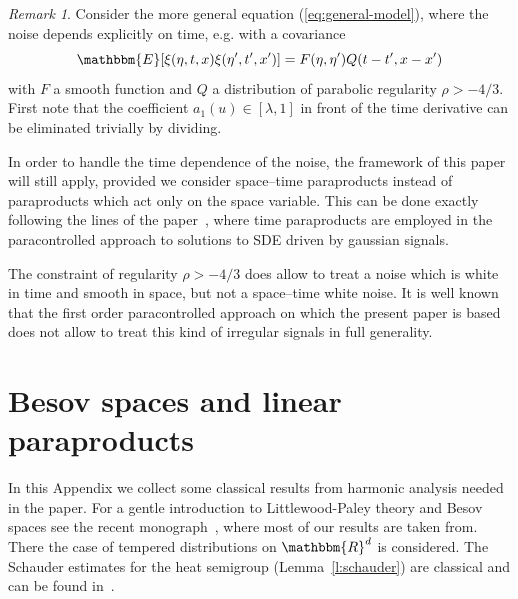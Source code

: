 \documentclass{amsart}
\theoremstyle{remark}
\newtheorem{remark}[theorem]{Remark}
\theoremstyle{definition}
\begin{document}
\begin{remark}
  Consider the more general equation (\ref{eq:general-model}), where the noise
  depends explicitly on time, e.g. with a covariance
  \[ \mathbbm{E} [\xi (\eta, t, x) \xi (\eta', t', x')] = F (\eta, \eta') Q (t
     - t', x - x') \]
  with $F$ a smooth function and $Q$ a distribution of parabolic regularity
  $\rho > - 4 / 3$. First note that the coefficient $a_1 (u) \in [\lambda, 1]$
  in front of the time derivative can be eliminated trivially by dividing.
  
  In order to handle the time dependence of the noise, the framework of this
  paper will still apply, provided we consider space--time paraproducts
  instead of paraproducts which act only on the space variable. This can be
  done exactly following the lines of the
  paper~{\cite{gubinelli_paracontrolled_2015}}, where time paraproducts are
  employed in the paracontrolled approach to solutions to SDE driven by
  gaussian signals.
  
  The constraint of regularity $\rho > - 4 / 3$ does allow to treat a noise
  which is white in time and smooth in space, but not a space--time white
  noise. It is well known that the first order paracontrolled approach on
  which the present paper is based does not allow to treat this kind of
  irregular signals in full generality.
\end{remark}

\appendix\section{Besov spaces and linear paraproducts}\label{appendix:besov}

In this Appendix we collect some classical results from harmonic analysis
needed in the paper. For a gentle introduction to Littlewood-Paley theory and
Besov spaces see the recent monograph~{\cite{bahouri_fourier_2011}}, where
most of our results are taken from. There the case of tempered distributions
on $\mathbbm{R}^d$ is considered. The Schauder estimates for the heat
semigroup (Lemma~\ref{l:schauder}) are classical and can be found
in~{\cite{gubinelli_paracontrolled_2015,gubinelli_lectures_2015}}.

\
\end{document}
